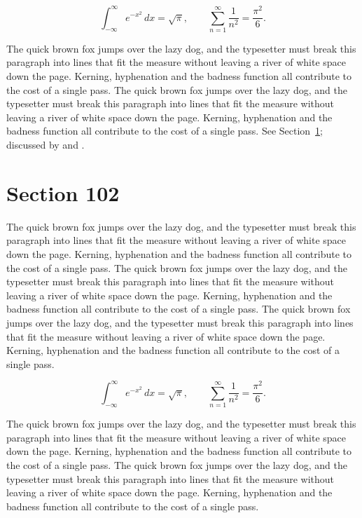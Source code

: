 \documentclass{article}
\begin{document}
\begin{equation}\label{eq:101}
\int_{-\infty}^{\infty} e^{-x^{2}}\,dx = \sqrt{\pi}, \qquad
\sum_{n=1}^{\infty} \frac{1}{n^{2}} = \frac{\pi^{2}}{6}.
\end{equation}

The quick brown fox jumps over the lazy dog, and the typesetter must break this paragraph into lines that fit the measure without leaving a river of white space down the page. Kerning, hyphenation and the badness function all contribute to the cost of a single pass. The quick brown fox jumps over the lazy dog, and the typesetter must break this paragraph into lines that fit the measure without leaving a river of white space down the page. Kerning, hyphenation and the badness function all contribute to the cost of a single pass. 
See Section~\ref{sec:102}; discussed by \textcite{k2} and \textcite{l4}.
\section{Section 102}
\label{sec:102}
The quick brown fox jumps over the lazy dog, and the typesetter must break this paragraph into lines that fit the measure without leaving a river of white space down the page. Kerning, hyphenation and the badness function all contribute to the cost of a single pass. The quick brown fox jumps over the lazy dog, and the typesetter must break this paragraph into lines that fit the measure without leaving a river of white space down the page. Kerning, hyphenation and the badness function all contribute to the cost of a single pass. The quick brown fox jumps over the lazy dog, and the typesetter must break this paragraph into lines that fit the measure without leaving a river of white space down the page. Kerning, hyphenation and the badness function all contribute to the cost of a single pass. 

\begin{equation}\label{eq:102}
\int_{-\infty}^{\infty} e^{-x^{2}}\,dx = \sqrt{\pi}, \qquad
\sum_{n=1}^{\infty} \frac{1}{n^{2}} = \frac{\pi^{2}}{6}.
\end{equation}

The quick brown fox jumps over the lazy dog, and the typesetter must break this paragraph into lines that fit the measure without leaving a river of white space down the page. Kerning, hyphenation and the badness function all contribute to the cost of a single pass. The quick brown fox jumps over the lazy dog, and the typesetter must break this paragraph into lines that fit the measure without leaving a river of white space down the page. Kerning, hyphenation and the badness function all contribute to the cost of a single pass. 
\end{document}

